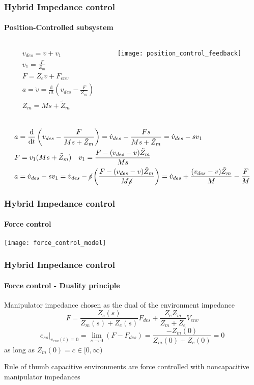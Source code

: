 \begin{frame}[shrink=10]
  \frametitle{Hybrid Impedance control}
  \framesubtitle{Position-Controlled subsystem}
  \begin{columns}
    \begin{column}{0.4\textwidth}
      \begin{align*}
        &v_{des} = v + v_1\\
        &v_1 = \frac{F}{Z_m}\\ 
        &F = Z_e v + F_{env}\\
        &a = \dot{v} = \frac{\mathrm{d}}{\mathrm{d}t} \left(v_{des} - \frac{F}{Z_m} \right)\\
        &Z_m = M s + \tilde{Z}_m\\
      \end{align*}
    \end{column}
    \begin{column}{0.5\textwidth}
      \centering
      \texttt{[image: position\_control\_feedback]}      
    \end{column}
  \end{columns}

  \begin{align*}
    &a = \frac{\mathrm{d}}{\mathrm{d}t} \left(v_{des} - \frac{F}{Ms + \tilde{Z}_m} \right) = \dot{v}_{des} - \frac{Fs}{Ms + \tilde{Z}_{m}} = \dot{v}_{des} - s v_1 \\
   &F = v_1 (Ms + \tilde{Z}_m) \quad v_1 = \frac{F - (v_{des} - v)\tilde{Z}_m}{Ms}\\
   &a = \dot{v}_{des} - s v_1 = \dot{v}_{des} - \cancel{s} \left( \frac{F - (v_{des} - v)\tilde{Z}_m}{M\cancel{s}} \right) = \dot{v}_{des} + \frac{(v_{des} - v)\tilde{Z}_m}{M} - \frac{F}{M}
  \end{align*}
\end{frame}

\begin{frame}
  \frametitle{Hybrid Impedance control}
  \framesubtitle{Force control}
  \centering
  \texttt{[image: force\_control\_model]}
\end{frame}

\begin{frame}
  \frametitle{Hybrid Impedance control}
  \framesubtitle{Force control - Duality principle}
  Manipulator impedance chosen as the dual of the environment impedance
  \begin{equation*}
    F = \frac{Z_e(s)}{Z_m(s) + Z_e(s)}F_{des} + \frac{Z_e Z_m}{Z_m + Z_e} V_{env}
  \end{equation*}
  \begin{equation*}
  e_{ss} \Big|_{v_{env}(t) \equiv 0} = \lim_{s \to 0}(F - F_{des}) = \frac{-Z_m(0)}{Z_m(0) + Z_e(0)} = 0
  \end{equation*}
  as long as $Z_m(0) = c \in [0, \infty)$
    
  \begin{block}{Rule of thumb}
    capacitive environments are force controlled with noncapacitive manipulator impedances
  \end{block}

\end{frame}

